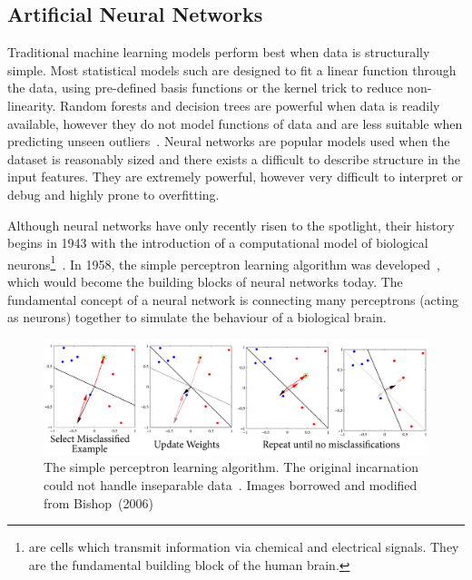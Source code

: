 \documentclass[12pt, twoside]{book}
\renewcommand\emph[1]{\textit{\color{USred}{#1}}}
\begin{document}
\subsection{Artificial Neural Networks}

 
Traditional machine learning models perform best when data is structurally simple. Most statistical models such are designed to fit a linear function through the data, using pre-defined basis functions or the kernel trick to reduce non-linearity. Random forests and decision trees are powerful when data is readily available, however they do not model functions of data and are less suitable when predicting unseen outliers~\cite{kramer2001propositionalization}. Neural networks are popular models used when the dataset is reasonably sized and there exists a difficult to describe structure in the input features. They are extremely powerful, however very difficult to interpret or debug and highly prone to overfitting.
 
\label{neuralnetworkintro}Although neural networks have only recently risen to the spotlight, their history begins in 1943 with the introduction of a computational model of biological neurons\footnote{\emph{Neurons} are cells which transmit information via chemical and electrical signals. They are the fundamental building block of the human brain.}~\cite{nn1943}.
In 1958, the simple perceptron learning algorithm was developed~\cite{rosenblatt1958perceptron}, which would become the building blocks of neural networks today. The fundamental concept of a neural network is connecting many perceptrons (acting as neurons) together to simulate the behaviour of a biological brain. 




\begin{figure}[h]
\label{perceptron}
\centering\includegraphics[width=1\linewidth]{perceptron.png}
\caption{The simple perceptron learning algorithm. The original incarnation could not handle inseparable data~\cite{rosenblatt1958perceptron}. Images borrowed and modified from Bishop~(2006)~\cite{prml} }
\end{figure}
\end{document}
